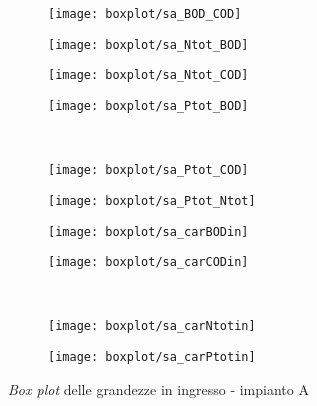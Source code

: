 \begin{figure}[h]
\begin{subfigure}{0.24\textwidth}
		\texttt{[image: boxplot/sa\_BOD\_COD]}	\centering
	\end{subfigure}
	\begin{subfigure}{0.24\textwidth}
		\texttt{[image: boxplot/sa\_Ntot\_BOD]}	\centering
	\end{subfigure}
	\begin{subfigure}{0.24\textwidth}
		\texttt{[image: boxplot/sa\_Ntot\_COD]}	\centering
	\end{subfigure}
	\begin{subfigure}{0.24\textwidth}
		\texttt{[image: boxplot/sa\_Ptot\_BOD]}	\centering
	\end{subfigure}
\\[1ex]
	\begin{subfigure}{0.24\textwidth}
		\texttt{[image: boxplot/sa\_Ptot\_COD]}	\centering
	\end{subfigure}
	\begin{subfigure}{0.24\textwidth}
		\texttt{[image: boxplot/sa\_Ptot\_Ntot]}	\centering
	\end{subfigure}
	\begin{subfigure}{0.24\textwidth}
		\texttt{[image: boxplot/sa\_carBODin]}	\centering
	\end{subfigure}
	\begin{subfigure}{0.24\textwidth}
		\texttt{[image: boxplot/sa\_carCODin]}	\centering
	\end{subfigure}
\\[1ex]
	\begin{subfigure}{0.24\textwidth}
		\texttt{[image: boxplot/sa\_carNtotin]}	\centering
	\end{subfigure}
	\begin{subfigure}{0.24\textwidth}
		\texttt{[image: boxplot/sa\_carPtotin]}	\centering
	\end{subfigure}
	\caption{\textit{Box plot} delle grandezze in ingresso - impianto A}
	\label{fig:sa_boxplotin}
\end{figure}

